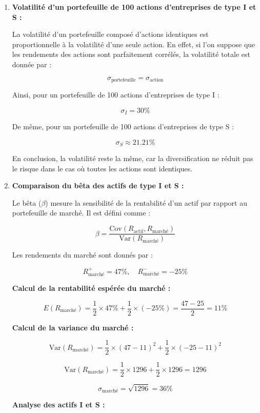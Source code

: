 \documentclass[a4paper, 12pt]{report}
\begin{document}
\begin{enumerate}
	\item \textbf{Volatilité d'un portefeuille de 100 actions d'entreprises de type I et S :}
	
	La volatilité d'un portefeuille composé d'actions identiques est proportionnelle à la volatilité d'une seule action. En effet, si l'on suppose que les rendements des actions sont parfaitement corrélés, la volatilité totale est donnée par :
	
	\[
	\sigma_{\text{portefeuille}} = \sigma_{\text{action}}
	\]
	
	Ainsi, pour un portefeuille de 100 actions d'entreprises de type I :
	
	\[
	\sigma_{I} = 30\%
	\]
	
	De même, pour un portefeuille de 100 actions d'entreprises de type S :
	
	\[
	\sigma_{S} \approx 21.21\%
	\]
	
	En conclusion, la volatilité reste la même, car la diversification ne réduit pas le risque dans le cas où toutes les actions sont identiques.
	
	\item \textbf{Comparaison du bêta des actifs de type I et S :}
	
	Le bêta (\(\beta\)) mesure la sensibilité de la rentabilité d'un actif par rapport au portefeuille de marché. Il est défini comme :
	
	\[
	\beta = \frac{\text{Cov}(R_{\text{actif}}, R_{\text{marché}})}{\text{Var}(R_{\text{marché}})}
	\]
	
	Les rendements du marché sont donnés par :
	
	\[
	R_{\text{marché}}^+ = 47\%, \quad R_{\text{marché}}^- = -25\%
	\]
	
	\textbf{Calcul de la rentabilité espérée du marché :}
	
	\[
	E(R_{\text{marché}}) = \frac{1}{2} \times 47\% + \frac{1}{2} \times (-25\%) = \frac{47 - 25}{2} = 11\%
	\]
	
	\textbf{Calcul de la variance du marché :}
	
	\[
	\text{Var}(R_{\text{marché}}) = \frac{1}{2} \times (47 - 11)^2 + \frac{1}{2} \times (-25 - 11)^2
	\]
	
	\[
	\text{Var}(R_{\text{marché}}) = \frac{1}{2} \times 1296 + \frac{1}{2} \times 1296 = 1296
	\]
	
	\[
	\sigma_{\text{marché}} = \sqrt{1296} = 36\%
	\]
	
	\textbf{Analyse des actifs I et S :}
	

\end{enumerate}
\end{document}
